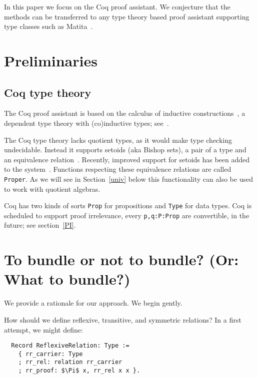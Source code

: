 \documentclass[a4paper,10pt,runningheads]{llncs}
\begin{document}
In this paper we focus on the Coq proof assistant. We conjecture that the methods can be transferred
to any type theory based proof assistant supporting type classes such as
Matita~\cite{asperti2007user}.

\section{Preliminaries}
\subsection{Coq type theory}
The Coq proof assistant is based on the calculus of inductive
constructions~\cite{CoquandHuet,CoquandPaulin}, a dependent type theory with (co)inductive types; see~\cite{Coq,BC04}.

The Coq type theory lacks quotient
types, as it would make type checking undecidable. Instead it supports setoids (aka Bishop sets), a pair of a type and an equivalence relation~\cite{Bishop67,Hofmann,Capretta}. Recently, improved support for setoids has been added to the system~\cite{Setoid-rewrite}. Functions respecting these equivalence relations are called \lstinline|Proper|.
As we will see in Section~\ref{univ} below this functionality can also be used to work with
quotient algebras.

Coq has two kinds of sorts \lstinline|Prop| for propositions and \lstinline|Type| for data types. Coq
is scheduled to support proof irrelevance, every \lstinline|p,q:P:Prop| are
convertible, in the future; see section~\ref{PI}.


\section{To bundle or not to bundle? (Or: What to bundle?)}\label{bundle}
We provide a rationale for our approach. We begin gently.

How should we define reflexive, transitive, and symmetric relations? In a first attempt, we
might define:
% 

\begin{lstlisting}
  Record ReflexiveRelation: Type :=
    { rr_carrier: Type
    ; rr_rel: relation rr_carrier
    ; rr_proof: $\Pi$ x, rr_rel x x }.
\end{lstlisting}
\end{document}
